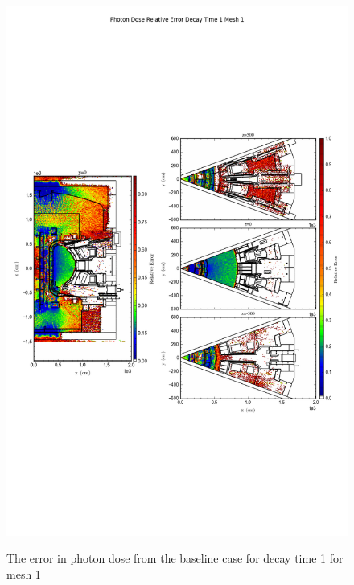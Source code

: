 \begin{figure}[ht!]
\centering
\includegraphics[trim={0cm 9cm 0cm 10cm},clip,scale=0.75]{../plots/final_model/Photon_Dose_Relative_Error_Decay_Time_1_Mesh_1.png}
\label{fig:photons_dc1_no4bc_m1_error}
\caption{The error in photon dose from the baseline case for decay time 1 for mesh 1}
\end{figure}

